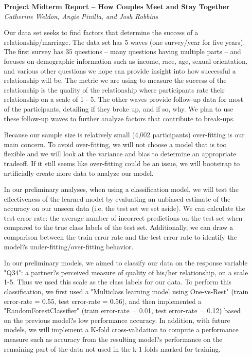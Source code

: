 \documentclass[12pt]{article}
\begin{document}
\begin{center}
\textbf{Project Midterm Report -- How Couples Meet and Stay Together}
\textit{Catherine Weldon, Angie Pinilla, and Josh Robbins}
\end{center}

Our data set seeks to find factors that determine the success of a relationship/marriage. The data set has 5 waves (one survey/year for five years). The first survey has 35 questions -- many questions having multiple parts -- and focuses on demographic information such as income, race, age, sexual orientation, and various other questions we hope can provide insight into how successful a relationship will be. The metric we are using to measure the success of the relationship is the quality of the relationship where participants rate their relationship on a scale of 1 - 5. The other waves provide follow-up data for most of the participants, detailing if they broke up, and if so, why. We plan to use these follow-up waves to further analyze factors that contribute to break-ups.  

Because our sample size is relatively small (4,002 participants) over-fitting is our main concern. To avoid over-fitting, we will not choose a model that is too flexible and we will look at the variance and bias to determine an appropriate tradeoff. If it still seems like over-fitting could be an issue, we will bootstrap to artificially create more data to analyze our model.  

In our preliminary analyses, when using a classification model, we will test the effectiveness of the learned model by evaluating an unbiased estimate of the accuracy on our unseen data (i.e. the test set we set aside). We can calculate the test error rate: the average number of incorrect predictions on the test set when compared to the true class labels of the test set. Additionally, we can draw a comparison between the train error rate and the test error rate to identify the model?s under-fitting/over-fitting behavior. 

In our preliminary models, we aimed to classify our data on the response variable "Q34": a partner?s perceived measure of quality of his/her relationship, on a scale 1-5. Thus we used this scale as the class labels for our data. To perform this classification, we first used a "Multiclass learning model using One-vs-Rest" (train error-rate = 0.55, test error-rate = 0.56), and then implemented a "RandomForestClassifier" (train error-rate = 0.01, test error-rate = 0.12)  based on the previous model?s low performance accuracy. In addition, with future models, we will implement a K-fold cross-validation to compute a performance measure such as accuracy from the resulting model?s performance on the remaining part of the data not used in the k-1 folds marked for training. 
\end{document}
